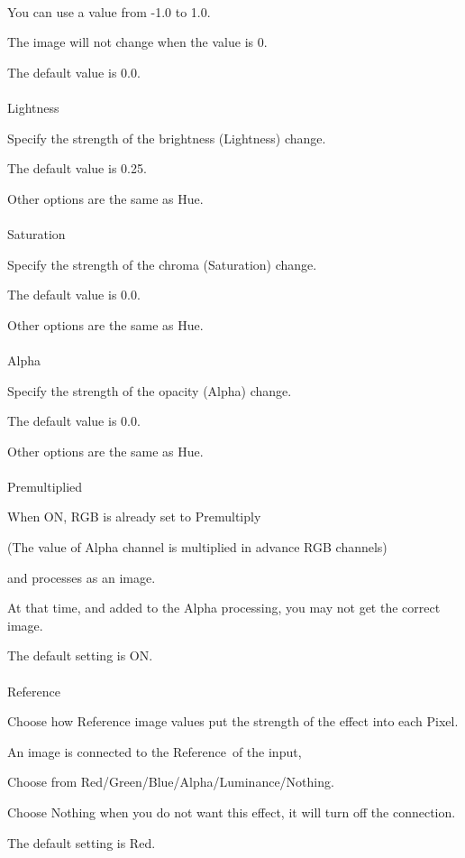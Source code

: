 \documentclass[a4paper,12pt]{article}
\begin{document}
\ \vspace{-0.2em}
\par
You can use a value from -1.0 to 1.0.\par
The image will not change when the value is 0.\par
The default value is 0.0.\\
\\
Lightness\par
Specify the strength of the brightness (Lightness) change.\par
The default value is 0.25.\par
Other options are the same as \textquotedbl Hue\textquotedbl .\\
\\
Saturation\par
Specify the strength of the chroma (Saturation) change.\par
The default value is 0.0.\par
Other options are the same as \textquotedbl Hue\textquotedbl .\\
\\
Alpha\par
Specify the strength of the opacity (Alpha) change.\par
The default value is 0.0.\par
Other options are the same as \textquotedbl Hue\textquotedbl .\\
\\
Premultiplied\par
When ON, RGB is already set to Premultiply\par
(The value of Alpha channel is multiplied in advance RGB channels)\par
and processes as an image.\par
At that time, and added to the Alpha processing, you may not get the correct image.\par
The default setting is ON.\\
\\
Reference\par
Choose how Reference image values put the strength of the effect into each Pixel.\par
An image is connected to the \textquotedbl Reference\textquotedbl \ of the input,\par
Choose from Red/Green/Blue/Alpha/Luminance/Nothing.\par
Choose Nothing when you do not want this effect, it will turn off the connection.\par
The default setting is Red.
\end{document}
